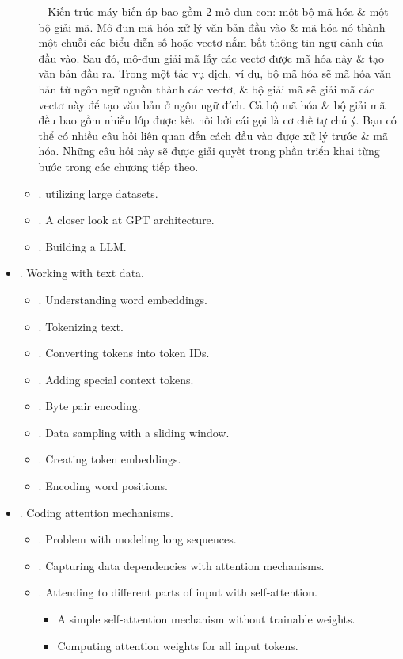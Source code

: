 \documentclass{article}
\begin{document}
\begin{itemize}
\begin{itemize}
		-- Kiến trúc máy biến áp bao gồm 2 mô-đun con: một bộ mã hóa \& một bộ giải mã. Mô-đun mã hóa xử lý văn bản đầu vào \& mã hóa nó thành một chuỗi các biểu diễn số hoặc vectơ nắm bắt thông tin ngữ cảnh của đầu vào. Sau đó, mô-đun giải mã lấy các vectơ được mã hóa này \& tạo văn bản đầu ra. Trong một tác vụ dịch, ví dụ, bộ mã hóa sẽ mã hóa văn bản từ ngôn ngữ nguồn thành các vectơ, \& bộ giải mã sẽ giải mã các vectơ này để tạo văn bản ở ngôn ngữ đích. Cả bộ mã hóa \& bộ giải mã đều bao gồm nhiều lớp được kết nối bởi cái gọi là cơ chế tự chú ý. Bạn có thể có nhiều câu hỏi liên quan đến cách đầu vào được xử lý trước \& mã hóa. Những câu hỏi này sẽ được giải quyết trong phần triển khai từng bước trong các chương tiếp theo.
		\item {. utilizing large datasets.}
		\item {. A closer look at GPT architecture.}
		\item {. Building a LLM.}
	\end{itemize}
	\item {. Working with text data.}
	\begin{itemize}
		\item {. Understanding word embeddings.}
		\item {. Tokenizing text.}
		\item {. Converting tokens into token IDs.}
		\item {. Adding special context tokens.}
		\item {. Byte pair encoding.}
		\item {. Data sampling with a sliding window.}
		\item {. Creating token embeddings.}
		\item {. Encoding word positions.}
	\end{itemize}
	\item {. Coding attention mechanisms.}
	\begin{itemize}
		\item {. Problem with modeling long sequences.}
		\item {. Capturing data dependencies with attention mechanisms.}
		\item {. Attending to different parts of input with self-attention.}
		\begin{itemize}
			\item {\sf A simple self-attention mechanism without trainable weights.}
			\item {\sf Computing attention weights for all input tokens.}

\end{itemize}
\end{itemize}
\end{itemize}
\end{document}
